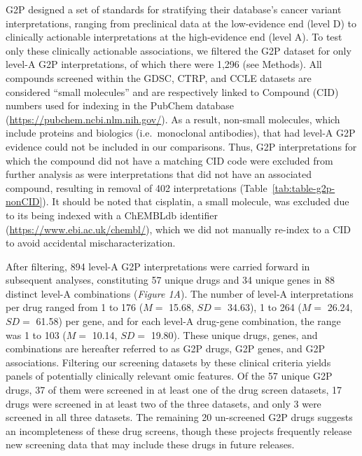 \documentclass[man,floatsintext]{apa6}
\begin{document}
G2P designed a set of standards for stratifying their database's cancer
variant interpretations, ranging from preclinical data at the
low-evidence end (level D) to clinically actionable interpretations at
the high-evidence end (level A). To test only these clinically
actionable associations, we filtered the G2P dataset for only level-A
G2P interpretations, of which there were 1,296 (see Methods). All
compounds screened within the GDSC, CTRP, and CCLE datasets are
considered \enquote{small molecules} and are respectively linked to
Compound (CID) numbers used for indexing in the PubChem database
(\url{https://pubchem.ncbi.nlm.nih.gov/}). As a result, non-small
molecules, which include proteins and biologics (i.e.~monoclonal
antibodies), that had level-A G2P evidence could not be included in our
comparisons. Thus, G2P interpretations for which the compound did not
have a matching CID code were excluded from further analysis as were
interpretations that did not have an associated compound, resulting in
removal of 402 interpretations (Table~\ref{tab:table-g2p-nonCID}). It
should be noted that cisplatin, a small molecule, was excluded due to
its being indexed with a ChEMBLdb identifier
(\url{https://www.ebi.ac.uk/chembl/}), which we did not manually
re-index to a CID to avoid accidental mischaracterization.

After filtering, 894 level-A G2P interpretations were carried forward in
subsequent analyses, constituting 57 unique drugs and 34 unique genes in
88 distinct level-A combinations (\emph{Figure 1A}). The number of
level-A interpretations per drug ranged from 1 to 176 (\(M =\) 15.68,
\(SD =\) 34.63), 1 to 264 (\(M =\) 26.24, \(SD =\) 61.58) per gene, and
for each level-A drug-gene combination, the range was 1 to 103 (\(M =\)
10.14, \(SD =\) 19.80). These unique drugs, genes, and combinations are
hereafter referred to as G2P drugs, G2P genes, and G2P associations.
Filtering our screening datasets by these clinical criteria yields
panels of potentially clinically relevant omic features. Of the 57
unique G2P drugs, 37 of them were screened in at least one of the drug
screen datasets, 17 drugs were screened in at least two of the three
datasets, and only 3 were screened in all three datasets. The remaining
20 un-screened G2P drugs suggests an incompleteness of these drug
screens, though these projects frequently release new screening data
that may include these drugs in future releases.
\end{document}
